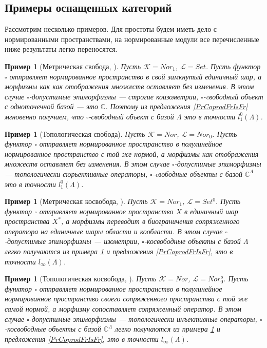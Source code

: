\documentclass[12pt]{article}
\newtheorem{example}[theorem]{Пример}
\begin{document}
\subsection{Примеры оснащенных категорий}

Рассмотрим несколько примеров. Для простоты будем иметь дело с нормированными пространствами, на нормированные модули все перечисленные ниже результаты легко переносятся.

\begin{example}[Метрическая свобода, \cite{HelMetrFrQmod}]\label{ExMetrFr}
Пусть $\mathcal{K} = Nor_1$, $\mathcal{L} = Set$. Пусть функтор $\square$ отправляет нормированное пространство в свой замкнутый единичный шар, а морфизмы как как отображения множеств оставляет 
без изменения. В этом случае $\square$-допустимые эпиморфизмы --- строгие коизометрии, $\square$-cвободный объект с одноточечной базой --- это $\mathbb{C}$. Поэтому из предложения \ref{PrCoprodFrIsFr} 
мгновенно получаем, что $\square$-свободный объект с базой $\Lambda$ это в точности $l_1^0(\Lambda)$.
\end{example}

\begin{example}[Топологическая свобода]\label{ExTopFr}
Пусть $\mathcal{K} = Nor$, $\mathcal{L} = Nor_0$. Пусть функтор $\square$ отправляет нормированное пространство в полулинейное нормированное пространство с той же нормой, а морфизмы как отображения множеств оставляет без изменения. В этом случае $\square$-допустимые эпиморфизмы --- топологически сюрьективные операторы, $\square$-cвободные объекты с базой $\mathbb{C}^\Lambda$ это в точности $l_1^0(\Lambda)$.
\end{example}

\begin{example}[Метрическая косвобода, \cite{HelMetrFrQmod}]\label{ExMetrCoFr}
Пусть $\mathcal{K} = Nor_1$, $\mathcal{L} = Set^0$. Пусть функтор $\square$ отправляет нормированное пространство $X$ в единичный шар пространства $X^*$, а морфизмы переводит в биограничения 
сопряженного оператора на единичные шары области и кообласти. В этом случае $\square$-допустимые эпиморфизмы --- изометрии, $\square$-косвободные объекты с базой $\Lambda$ легко получаются из примера \ref{ExMetrFr} 
и предложения \ref{PrCoprodFrIsFr}, это в точности $l_\infty(\Lambda)$.
\end{example}

\begin{example}[Топологическая косвобода, \cite{ShtTopFr}]\label{ExTopCoFr}
Пусть $\mathcal{K} = Nor$, $\mathcal{L} = Nor_0^o$. Пусть функтор $\square$ отправляет нормированное пространство в полулинейное нормированное пространство своего сопряженного пространства с той же самой нормой, а морфизму сопоставляет сопряженный оператор. В этом случае $\square$-допустимые 
эпиморфизмы --- топологически инъективные операторы, $\square$-косвободные объекты с базой $\mathbb{C}^\Lambda$ легко получаются из примера \ref{ExTopFr} и предложения \ref{PrCoprodFrIsFr}, это в точности $l_\infty(\Lambda)$. 
\end{example}
\end{document}
